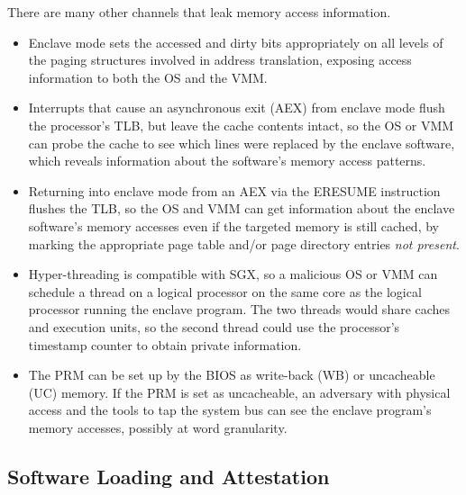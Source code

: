There are many other channels that leak memory access information.

\begin{itemize}

\item Enclave mode sets the accessed and dirty bits appropriately on all levels
      of the paging structures involved in address translation, exposing access
      information to both the OS and the VMM.

\item Interrupts that cause an asynchronous exit (AEX) from enclave mode flush
      the processor's TLB, but leave the cache contents intact, so the OS or
      VMM can probe the cache to see which lines were replaced by the enclave
      software, which reveals information about the software's memory access
      patterns.

\item Returning into enclave mode from an AEX via the ERESUME instruction
      flushes the TLB, so the OS and VMM can get information about the enclave
      software's memory accesses even if the targeted memory is still cached,
      by marking the appropriate page table and/or page directory entries
      \textit{not present}.

\item Hyper-threading is compatible with SGX, so a malicious OS or VMM can
      schedule a thread on a logical processor on the same core as the logical
      processor running the enclave program. The two threads would share
      caches and execution units, so the second thread could use the
      processor's timestamp counter \cite{petters1999making} to obtain private
      information.

\item The PRM can be set up by the BIOS as write-back (WB) or uncacheable (UC)
      memory. If the PRM is set as uncacheable, an adversary with physical
      access and the tools to tap the system bus can see the enclave program's
      memory accesses, possibly at word granularity.

\end{itemize}


\subsection{Software Loading and Attestation}

